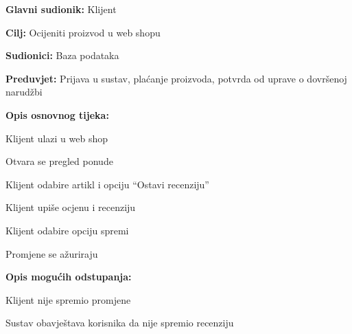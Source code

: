				\pagebreak
				
				\noindent {}
				\begin{packed_item}
					
					\item \textbf{Glavni sudionik: } Klijent
					\item  \textbf{Cilj:} Ocijeniti proizvod u web shopu
					\item  \textbf{Sudionici:} Baza podataka
					\item  \textbf{Preduvjet:}  Prijava u sustav, plaćanje proizvoda, potvrda od uprave o dovršenoj narudžbi
					\item  \textbf{Opis osnovnog tijeka:}
					
					\item[] \begin{packed_enum}
						\item Klijent ulazi u web shop
						\item Otvara se pregled ponude
						\item Klijent odabire artikl i opciju “Ostavi recenziju”
						\item Klijent upiše ocjenu i recenziju 
						\item Klijent odabire opciju spremi
						\item Promjene se ažuriraju
					\end{packed_enum}
					\item  \textbf{Opis mogućih odstupanja:}
					\item[] \begin{packed_item}
						\item[5.a]      Klijent nije spremio promjene
						\item[] \begin{packed_enum}
							\item         Sustav obavještava korisnika da nije spremio recenziju
						\end{packed_enum}
					\end{packed_item}
				\end{packed_item}
				
				\vspace{10px}
				
